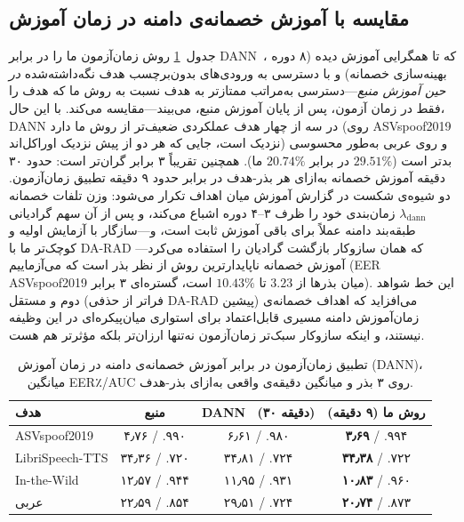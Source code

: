 \documentclass[a4paper,11pt]{article}
\begin{document}
\subsection{مقایسه با آموزش خصمانه‌ی دامنه در زمان آموزش}
\label{sec:dann}
جدول~\ref{tab:dann} روش زمان‌آزمون ما را در برابر DANN~\cite{dann}، که تا
همگرایی آموزش دیده (۸ دوره بهینه‌سازی خصمانه) و با دسترسی به ورودی‌های
بدون‌برچسب هدف نگه‌داشته‌شده \emph{در حین آموزش منبع}---دسترسی به‌مراتب
ممتازتر به هدف نسبت به روش ما که هدف را فقط در زمان آزمون، پس از پایان
آموزش منبع، می‌بیند---مقایسه می‌کند. با این حال، DANN در سه از چهار هدف
عملکردی ضعیف‌تر از روش ما دارد (روی ASVspoof2019 نزدیک است، جایی که هر دو
از پیش نزدیک اوراکل‌اند) و روی عربی به‌طور محسوسی بدتر است ($29.51\%$ در
برابر $20.74\%$ ما). همچنین تقریباً ۳ برابر گران‌تر است: حدود ۳۰ دقیقه آموزش
خصمانه به‌ازای هر بذر-هدف در برابر حدود ۹ دقیقه تطبیق زمان‌آزمون. دو شیوه‌ی
شکست در گزارش آموزش میان اهداف تکرار می‌شود: وزن تلفات خصمانه
$\lambda_{\mathrm{dann}}$ زمان‌بندی خود را ظرف ۳--۴ دوره اشباع می‌کند، و
پس از آن سهم گرادیانی طبقه‌بند دامنه عملاً برای باقی آموزش ثابت است، و---سازگار
با آزمایش اولیه و کوچک‌تر ما با DA-RAD که همان سازوکار بازگشت گرادیان را
استفاده می‌کرد---آموزش خصمانه ناپایدارترین روش از نظر بذر است که می‌آزماییم
(EER ASVspoof2019 میان بذرها از $3.23$ تا $10.43\%$ است، گستره‌ای ۳ برابر).
این خط شواهد دوم و مستقل (فراتر از حذفی DA-RAD پیشین) می‌افزاید که اهداف
خصمانه‌ی زمان‌آموزش دامنه مسیری قابل‌اعتماد برای استواری میان‌پیکره‌ای در
این وظیفه نیستند، و اینکه سازوکار سبک‌تر زمان‌آزمون نه‌تنها ارزان‌تر بلکه
مؤثرتر هم هست.

\begin{table}[t]
\centering
\caption{تطبیق زمان‌آزمون در برابر آموزش خصمانه‌ی دامنه در زمان آموزش
(DANN)، میانگین EER٪/AUC روی ۳ بذر و میانگین دقیقه‌ی واقعی به‌ازای
بذر-هدف.}
\label{tab:dann}
\begin{tabular}{@{}lccc@{}}
\toprule
هدف & منبع & DANN~\cite{dann} (۳۰ دقیقه) & روش ما (۹ دقیقه) \\
\midrule
ASVspoof2019 & ۴٫۷۶ / .۹۹۰ & ۶٫۶۱ / .۹۸۰ & \textbf{۳٫۶۹} / .۹۹۴ \\
LibriSpeech-TTS & ۳۴٫۳۶ / .۷۲۰ & ۳۴٫۸۱ / .۷۲۴ & \textbf{۳۴٫۳۸} / .۷۲۲ \\
In-the-Wild & ۱۲٫۵۷ / .۹۴۴ & ۱۱٫۹۵ / .۹۳۱ & \textbf{۱۰٫۸۳} / .۹۶۰ \\
عربی & ۲۲٫۵۹ / .۸۵۴ & ۲۹٫۵۱ / .۷۲۴ & \textbf{۲۰٫۷۴} / .۸۷۳ \\
\bottomrule
\end{tabular}
\end{table}
\end{document}
